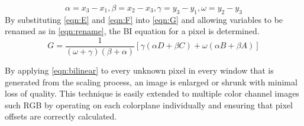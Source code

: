 \begin{equation}
  \alpha = x_3 - x_1, 
  \beta = x_2 - x_3, 
  \gamma = y_3 - y_1, 
  \omega = y_2 - y_3
  \label{eqn:rename}
\end{equation}
By substituting \eqref{eqn:E} and \eqref{eqn:F} into \eqref{eqn:G} and allowing variables to be renamed as in \eqref{eqn:rename}, the BI equation for a pixel is determined.
\begin{equation}
  G = \frac{1}{(\omega + \gamma)(\beta + \alpha)}[\gamma(\alpha D + \beta C) + \omega(\alpha B + \beta A)]
  \label{eqn:bilinear}
\end{equation}

By applying \eqref{eqn:bilinear} to every unknown pixel in every window that is generated from the scaling process, an image is enlarged or shrunk with minimal loss of quality.  This technique is easily extended to multiple color channel images such RGB by operating on each colorplane individually and ensuring that pixel offsets are correctly calculated.
